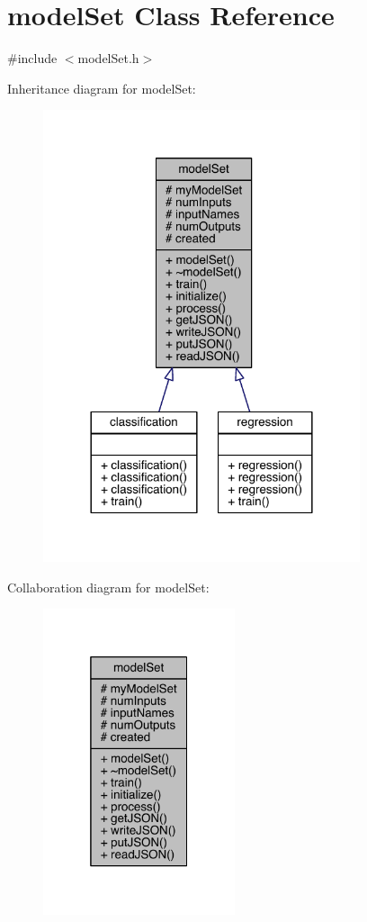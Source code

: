 \hypertarget{classmodel_set}{}\section{model\+Set Class Reference}
\label{classmodel_set}


{\ttfamily \#include $<$model\+Set.\+h$>$}



Inheritance diagram for model\+Set\+:
\nopagebreak
\begin{figure}[H]
\begin{center}
\leavevmode
\includegraphics[width=264pt]{classmodel_set__inherit__graph}
\end{center}
\end{figure}


Collaboration diagram for model\+Set\+:
\nopagebreak
\begin{figure}[H]
\begin{center}
\leavevmode
\includegraphics[width=160pt]{classmodel_set__coll__graph}
\end{center}
\end{figure}
